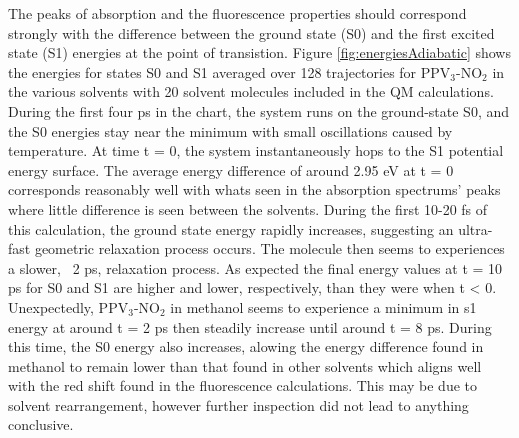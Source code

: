 The peaks of absorption and the fluorescence properties should correspond strongly with the difference between the ground state (S0) and the first excited state (S1) energies at the point of transistion.
Figure \ref{fig:energiesAdiabatic} shows the energies for states S0 and S1 averaged over 128 trajectories for PPV\(_3\)-NO\(_2\) in the various solvents with 20 solvent molecules included in the QM calculations.
During the first four ps in the chart, the system runs on the ground-state S0, and the S0 energies stay near the minimum with small oscillations caused by temperature.
At time t = 0, the system instantaneously hops to the S1 potential energy surface.
The average energy difference of around 2.95 eV at t = 0 corresponds reasonably well with whats seen in the absorption spectrums' peaks where little difference is seen between the solvents. During the first 10-20 fs of this calculation, the ground state energy rapidly increases, suggesting an ultra-fast geometric relaxation process occurs. The molecule then seems to experiences a slower, ~2 ps, relaxation process.
As expected the final energy values at t = 10 ps for S0 and S1 are higher and lower, respectively, than they were when t < 0.
Unexpectedly, PPV\(_3\)-NO\(_2\) in methanol seems to experience a minimum in s1 energy at around t = 2 ps then steadily increase until around t = 8 ps. During this time, the S0 energy also increases, alowing the energy difference found in methanol to remain lower than that found in other solvents which aligns well with the red shift found in the fluorescence calculations. This may be due to solvent rearrangement, however further inspection did not lead to anything conclusive.

